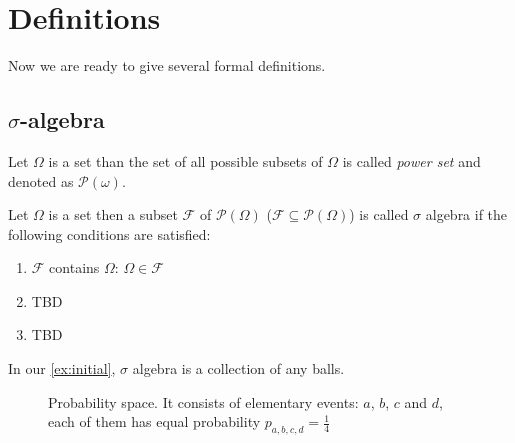 \section{Definitions}
Now we are ready to give several formal definitions. 
\subsection{$\sigma$-algebra}
\begin{definition}
\label{def:powerset}
Let $\Omega$ is a set than the set of all possible subsets of $\Omega$
is called \textit{power set} and denoted as
$\mathcal{P}\left(\omega\right)$. 
\end{definition}

\begin{definition}
Let $\Omega$ is a set then a subset $\mathcal{F}$ of
 $\mathcal{P}\left(\Omega\right)$ ($\mathcal{F}\subseteq
\mathcal{P}\left(\Omega\right)$) is called $\sigma$ algebra if the
following conditions are 
satisfied:
\begin{enumerate}
\item $\mathcal{F}$ contains $\Omega$: $\Omega \in \mathcal{F}$
\item TBD
\item TBD
\end{enumerate} 
\end{definition}

In our \cref{ex:initial}, $\sigma$ algebra is a collection of any
balls. 

\begin{figure}
  \centering
  \caption{Probability space. It consists of elementary events: $a$,
    $b$, $c$ and $d$, each
    of them has equal probability $p_{a,b,c,d} = \frac{1}{4}$}
  \label{fig:probabilityspace}
\end{figure}

